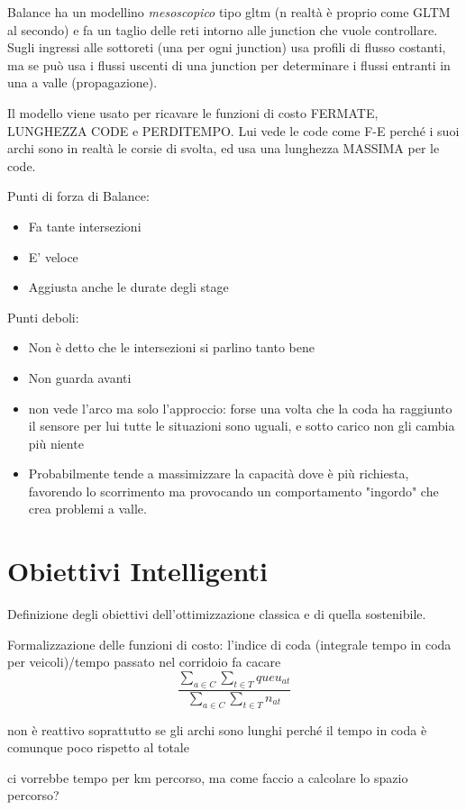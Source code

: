 \documentclass[10pt,a4paper,twoside]{book}
\begin{document}
Balance ha un modellino \emph{mesoscopico} tipo gltm (n realtà è proprio come GLTM al secondo) e fa un taglio delle reti intorno alle junction che vuole controllare. Sugli ingressi alle sottoreti (una per ogni junction) usa profili di flusso costanti, ma se può usa i flussi uscenti di una junction per determinare i flussi entranti in una a valle (propagazione).

Il modello viene usato per ricavare le funzioni di costo FERMATE, LUNGHEZZA CODE e PERDITEMPO.
Lui vede le code come F-E perché i suoi archi sono in realtà le corsie di svolta, ed usa una lunghezza MASSIMA per le code.

Punti di forza di Balance:
\begin{itemize}
\item Fa tante intersezioni
\item E' veloce
\item Aggiusta anche le durate degli stage
\end{itemize}

Punti deboli:
\begin{itemize}
\item Non è detto che le intersezioni si parlino tanto bene
\item Non guarda avanti
\item non vede l'arco ma solo l'approccio: forse una volta che la coda ha raggiunto il sensore per lui tutte le situazioni sono uguali, e sotto carico non gli cambia più niente
\item Probabilmente tende a massimizzare la capacità dove è più richiesta, favorendo lo scorrimento ma provocando un comportamento "ingordo" che crea problemi a valle.
\end{itemize}


\chapter{Obiettivi Intelligenti}
Definizione degli obiettivi dell'ottimizzazione classica e di quella sostenibile.

Formalizzazione delle funzioni di costo:
l'indice di coda (integrale tempo in coda per veicoli)/tempo passato nel corridoio fa cacare
$$
\frac{\sum_{a \in C} \sum_{t \in T}{queu_{at}}}{\sum_{a \in C} \sum_{t \in T}{n_{at}}}
$$

non è reattivo soprattutto se gli archi sono lunghi perché il tempo in coda è comunque poco rispetto al totale

ci vorrebbe tempo per km percorso, ma come faccio a calcolare lo spazio percorso?
\end{document}
